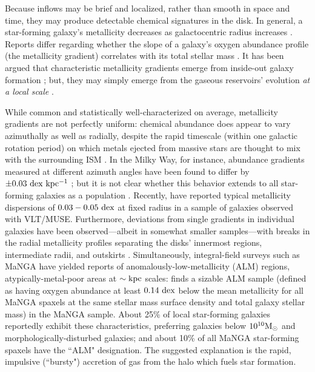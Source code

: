 Because inflows may be brief and localized, rather than smooth in space and time, they may produce detectable chemical signatures in the disk. In general, a star-forming galaxy's metallicity decreases as galactocentric radius increases \citep{oey_kennicutt_1993, zaritsky_1994, sanchez_2014_metgrad, belfiore_2017_manga-metgrad, poetrodjojo_18, sanchez_19_review}. Reports differ regarding whether the slope of a galaxy's oxygen abundance profile (the metallicity gradient) correlates with its total stellar mass \citep{sanchez_2014_metgrad, belfiore_2017_manga-metgrad, zinchenko_2019, mingozzi_2020}. It has been argued that characteristic metallicity gradients emerge from inside-out galaxy formation \citep{prantzos_boissier_2000_metgrad}; but, they may simply emerge from the gaseous reservoirs' evolution \emph{at a local scale} \citep{moran_2012, zhu_2017_leakybox_smsd, barrera-ballesteros_2018, sanchez_almeida_localfmr, bluck_2019_global-local}. 

While common and statistically well-characterized on average, metallicity gradients are not perfectly uniform: chemical abundance does appear to vary azimuthally as well as radially, despite the rapid timescale (within one galactic rotation period) on which metals ejected from massive stars are thought to mix with the surrounding ISM \citep{petit_2015_azimixing}. In the Milky Way, for instance, abundance gradients measured at different azimuth angles have been found to differ by $\pm 0.03 ~ {\rm dex ~ kpc^{-1}}$ \citep{balser_2015_MWmetgrad}; but it is not clear whether this behavior extends to all star-forming galaxies as a population \citep[for a diversity of views, see][]{kreckel_2016_interarm, sanchez-menguiano_2016, vogt_2017_metgrad-azi, ho_2017_metgrad-azi, ho_2018_metgrad-azi}. Recently, \citet{kreckel_2019_phangs_metgrads} have reported typical metallicity dispersions of $0.03 - 0.05 ~ {\rm dex}$ at fixed radius in a sample of galaxies observed with VLT/MUSE. Furthermore, deviations from single gradients in individual galaxies have been observed---albeit in somewhat smaller samples---with breaks in the radial metallicity profiles separating the disks' innermost regions, intermediate radii, and outskirts \citep{sanchez-menguiano_2019}. Simultaneously, integral-field surveys such as MaNGA have yielded reports of anomalously-low-metallicity (ALM) regions, atypically-metal-poor areas at $\sim {\rm kpc}$ scales: \citet{hwang_2019_manga_almrs} finds a sizable ALM sample (defined as having oxygen abundance at least $0.14 ~ {\rm dex}$ below the mean metallicity for all MaNGA spaxels at the same stellar mass surface density and total galaxy stellar mass) in the MaNGA sample. About 25\% of local star-forming galaxies reportedly exhibit these characteristics, preferring galaxies below $10^{10} {\rm M_{\odot}}$ and morphologically-disturbed galaxies; and about 10\% of all MaNGA star-forming spaxels have the ``ALM" designation. The suggested explanation is the rapid, impulsive (``bursty") accretion of gas from the halo which fuels star formation.

